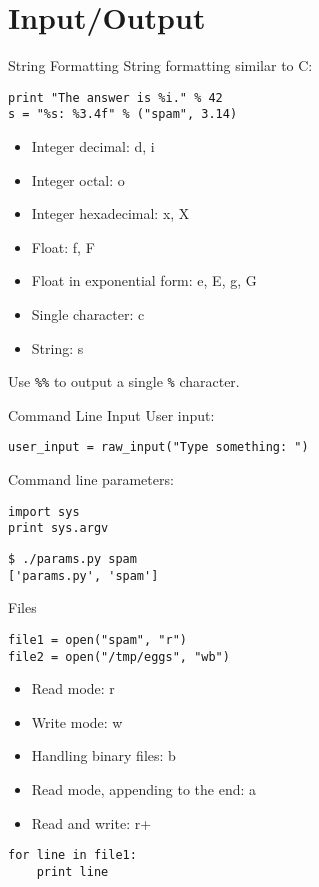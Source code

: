 \section{Input/Output}

\begin{frame}[fragile]{String Formatting}
String formatting similar to C:
\begin{lstlisting}[style=Python]
print "The answer is %i." % 42
s = "%s: %3.4f" % ("spam", 3.14)
\end{lstlisting}
\begin{itemize}
\item \alert{Integer decimal}: d, i
\item Integer octal: o
\item Integer hexadecimal: x, X
\item \alert{Float}: f, F
\item Float in exponential form: e, E, g, G
\item Single character: c
\item \alert{String}: s
\end{itemize}
Use \texttt{\%\%} to output a single \texttt{\%} character.
\end{frame}

\begin{frame}[fragile]{Command Line Input}
User input:
\begin{lstlisting}[style=Python]
user_input = raw_input("Type something: ")
\end{lstlisting}
\vspace{3mm}
Command line parameters:
\begin{lstlisting}[style=Python]
import sys
print sys.argv
\end{lstlisting}
\begin{lstlisting}[style=Shell]
$ ./params.py spam
['params.py', 'spam']
\end{lstlisting} %
\end{frame}

\begin{frame}[fragile]{Files}
\begin{lstlisting}[style=Python]
file1 = open("spam", "r")
file2 = open("/tmp/eggs", "wb")
\end{lstlisting}
\begin{itemize}
\item Read mode: r
\item Write mode: w
\item Handling binary files: b
\item Read mode, appending to the end: a
\item Read and write: r+
\end{itemize}
\begin{lstlisting}
for line in file1:
    print line
\end{lstlisting}
\end{frame}

